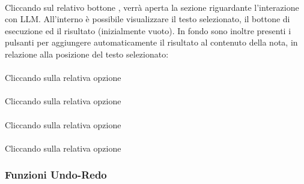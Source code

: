 \documentclass[a4paper,10pt]{article}
\begin{document}
  \paragraph{}

    Cliccando sul relativo bottone , verrà aperta la sezione riguardante l'interazione con LLM. All'interno è possibile visualizzare il testo selezionato, il bottone di esecuzione ed il risultato (inizialmente vuoto). 
    In fondo sono inoltre presenti i pulsanti per aggiungere automaticamente il risultato al contenuto della nota, in relazione alla posizione del testo selezionato:


    
    


    
  \paragraph{}

    Cliccando sulla relativa opzione  

  \paragraph{}

    Cliccando sulla relativa opzione 

  \paragraph{}

    Cliccando sulla relativa opzione 

  \paragraph{}

    Cliccando sulla relativa opzione 












  \subsubsection{Funzioni Undo-Redo}
\end{document}
